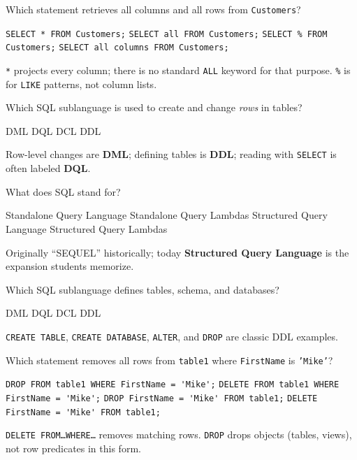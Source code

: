 \question[4]
Which statement retrieves all columns and all rows from \texttt{Customers}?
\begin{choices}
  \CorrectChoice \lstinline[style=sqlinline]!SELECT * FROM Customers;!
  \choice \lstinline[style=sqlinline]!SELECT all FROM Customers;!
  \choice \lstinline[style=sqlinline]!SELECT % FROM Customers;!
  \choice \lstinline[style=sqlinline]!SELECT all columns FROM Customers;!
\end{choices}
\begin{solution}
  \texttt{*} projects every column; there is no standard \texttt{ALL} keyword for that purpose. \texttt{\%} is for \texttt{LIKE} patterns, not column lists.
\end{solution}

\question[4]
Which SQL sublanguage is used to create and change \emph{rows} in tables?
\begin{choices}
  \CorrectChoice DML
  \choice DQL
  \choice DCL
  \choice DDL
\end{choices}
\begin{solution}
  Row-level changes are \textbf{DML}; defining tables is \textbf{DDL}; reading with \texttt{SELECT} is often labeled \textbf{DQL}.
\end{solution}

\question[4]
What does SQL stand for?
\begin{choices}
  \choice Standalone Query Language
  \choice Standalone Query Lambdas
  \CorrectChoice Structured Query Language
  \choice Structured Query Lambdas
\end{choices}
\begin{solution}
  Originally ``SEQUEL'' historically; today \textbf{Structured Query Language} is the expansion students memorize.
\end{solution}

\question[4]
Which SQL sublanguage defines tables, schema, and databases?
\begin{choices}
  \choice DML
  \choice DQL
  \choice DCL
  \CorrectChoice DDL
\end{choices}
\begin{solution}
  \texttt{CREATE TABLE}, \texttt{CREATE DATABASE}, \texttt{ALTER}, and \texttt{DROP} are classic DDL examples.
\end{solution}

\question[4]
Which statement removes all rows from \texttt{table1} where \texttt{FirstName} is \texttt{'Mike'}?
\begin{choices}
  \choice \lstinline[style=sqlinline]!DROP FROM table1 WHERE FirstName = 'Mike';!
  \CorrectChoice \lstinline[style=sqlinline]!DELETE FROM table1 WHERE FirstName = 'Mike';!
  \choice \lstinline[style=sqlinline]!DROP FirstName = 'Mike' FROM table1;!
  \choice \lstinline[style=sqlinline]!DELETE FirstName = 'Mike' FROM table1;!
\end{choices}
\begin{solution}
  \texttt{DELETE FROM\ldots WHERE\ldots} removes matching rows. \texttt{DROP} drops objects (tables, views), not row predicates in this form.
\end{solution}


